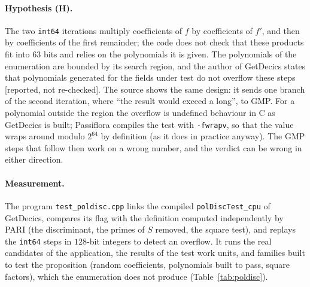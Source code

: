 \documentclass[10pt,a4paper]{article}
\newcommand{\code}[1]{\texttt{#1}}
\newcommand{\streport}{\textsf{\small[reported, not re-checked]}\xspace}
\theoremstyle{plain}
\theoremstyle{definition}
\begin{document}
\paragraph{Hypothesis (H).}  The two \code{int64} iterations multiply coefficients of $f$ by coefficients of $f'$, and then by coefficients of the first remainder;
the code does not check that these products fit into $63$ bits and relies on the polynomials it is given.  The polynomials of the enumeration are bounded by its
search region, and the author of GetDecics states that polynomials generated for the fields under test do not overflow these steps \streport.  The source shows the
same design: it sends one branch of the second iteration, where ``the result would exceed a long'', to GMP.  For a polynomial outside the region the overflow is
undefined behaviour in C as GetDecics is built; Passiflora compiles the test with \code{-fwrapv}, so that the value wraps around modulo $2^{64}$ by definition (as it
does in practice anyway).  The GMP steps that follow then work on a wrong number, and the verdict can be wrong in either direction.

\paragraph{Measurement.}  The program \code{test\_poldisc.cpp} links the compiled \code{polDiscTest\_cpu} of GetDecics, compares its flag with the definition computed
independently by PARI (the discriminant, the primes of $S$ removed, the square test), and replays the \code{int64} steps in $128$-bit integers to detect an overflow.
It runs the real candidates of the application, the results of the test work units, and families built to test the proposition (random coefficients,
polynomials built to pass, square factors), which the enumeration does not produce (Table~\ref{tab:poldisc}).
\end{document}
